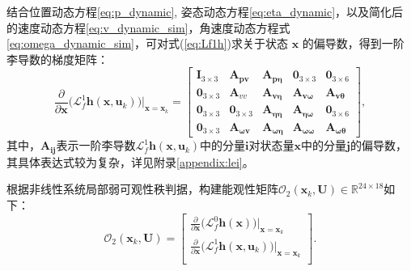 结合位置动态方程\ref{eq:p_dynamic}, 姿态动态方程\ref{eq:eta_dynamic}，以及简化后的速度动态方程\ref{eq:v_dynamic_sim}，角速度动态方程式\eqref{eq:omega_dynamic_sim}，可对式(\ref{eq:Lf1h})求关于状态 $\boldsymbol{x}$ 的偏导数，得到一阶李导数的梯度矩阵：
\begin{equation}
    \frac{\partial}{\partial \boldsymbol{x}}\big( \mathcal{L}_f^1 \boldsymbol{h}(\boldsymbol{x}, \boldsymbol{u}_k) \big)\Big|_{\boldsymbol{x}=\boldsymbol{x}_k} = 
    \begin{bmatrix}
        \boldsymbol{I}_{3 \times 3} & \boldsymbol{A}_{\boldsymbol{p} \boldsymbol{v}} & \boldsymbol{A}_{\boldsymbol{p} \boldsymbol{\eta}} & \boldsymbol{0}_{3 \times 3} & \boldsymbol{0}_{3 \times 6} \\
        \boldsymbol{0}_{3 \times 3} & \boldsymbol{A}_{v v} & \boldsymbol{A}_{\boldsymbol{v \eta}} & \boldsymbol{A}_{\boldsymbol{v \omega}} & \boldsymbol{A}_{\boldsymbol{v \theta}} \\
        \boldsymbol{0}_{3 \times 3} & \boldsymbol{0}_{3 \times 3} & \boldsymbol{A}_{\boldsymbol{\eta \eta}} & \boldsymbol{A}_{\boldsymbol{\eta \omega}} & \boldsymbol{0}_{3 \times 6} \\
        \boldsymbol{0}_{3 \times 3} & \boldsymbol{A}_{\boldsymbol{\omega v}} & \boldsymbol{A}_{\boldsymbol{\omega \eta}} & \boldsymbol{A}_{\boldsymbol{\omega \omega}} & \boldsymbol{A}_{\boldsymbol{\omega \theta}}
    \end{bmatrix},
    \label{eq:lei_sim}
\end{equation}
其中，$\boldsymbol{A}_{\boldsymbol{ij}}$表示一阶李导数$\mathcal{L}_f^1 \boldsymbol{h}(\boldsymbol{x}, \boldsymbol{u}_k)$中的分量$\boldsymbol{i}$对状态量$\boldsymbol{x}$中的分量$\boldsymbol{j}$的偏导数，其具体表达式较为复杂，详见附录\ref{appendix:lei}。

根据非线性系统局部弱可观性秩判据，构建能观性矩阵$\mathcal{O}_2(\boldsymbol{x}_k, \boldsymbol{U}) \in \mathbb{R}^{24 \times 18}$如下：
\begin{equation}
    \mathcal{O}_2(\boldsymbol{x}_k, \boldsymbol{U}) = 
    \begin{bmatrix}
        \frac{\partial}{\partial \boldsymbol{x}}\big( \mathcal{L}_f^0 \boldsymbol{h}(\boldsymbol{x}) \big)\Big|_{\boldsymbol{x}=\boldsymbol{x}_k} \\[10pt]
        \frac{\partial}{\partial \boldsymbol{x}}\big( \mathcal{L}_f^1 \boldsymbol{h}(\boldsymbol{x}, \boldsymbol{u}_k) \big)\Big|_{\boldsymbol{x}=\boldsymbol{x}_k} \\[10pt]
    \end{bmatrix}.
\end{equation}

